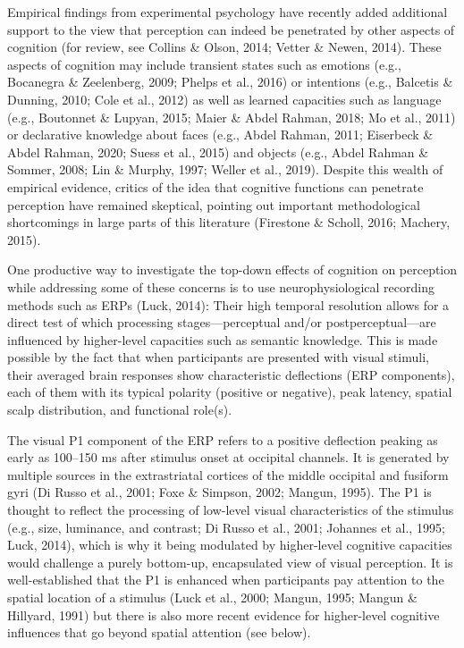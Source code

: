 \documentclass[
  english,
  doc,12pt,twoside,floatsintext]{apa7}
\begin{document}
Empirical findings from experimental psychology have recently added additional support to the view that perception can indeed be penetrated by other aspects of cognition (for review, see Collins \& Olson, 2014; Vetter \& Newen, 2014). These aspects of cognition may include transient states such as emotions (e.g., Bocanegra \& Zeelenberg, 2009; Phelps et al., 2016) or intentions (e.g., Balcetis \& Dunning, 2010; Cole et al., 2012) as well as learned capacities such as language (e.g., Boutonnet \& Lupyan, 2015; Maier \& Abdel Rahman, 2018; Mo et al., 2011) or declarative knowledge about faces (e.g., Abdel Rahman, 2011; Eiserbeck \& Abdel Rahman, 2020; Suess et al., 2015) and objects (e.g., Abdel Rahman \& Sommer, 2008; Lin \& Murphy, 1997; Weller et al., 2019). Despite this wealth of empirical evidence, critics of the idea that cognitive functions can penetrate perception have remained skeptical, pointing out important methodological shortcomings in large parts of this literature (Firestone \& Scholl, 2016; Machery, 2015).

One productive way to investigate the top-down effects of cognition on perception while addressing some of these concerns is to use neurophysiological recording methods such as ERPs (Luck, 2014): Their high temporal resolution allows for a direct test of which processing stages---perceptual and/or postperceptual---are influenced by higher-level capacities such as semantic knowledge. This is made possible by the fact that when participants are presented with visual stimuli, their averaged brain responses show characteristic deflections (ERP components), each of them with its typical polarity (positive or negative), peak latency, spatial scalp distribution, and functional role(s).

The visual P1 component of the ERP refers to a positive deflection peaking as early as 100--150 ms after stimulus onset at occipital channels. It is generated by multiple sources in the extrastriatal cortices of the middle occipital and fusiform gyri (Di Russo et al., 2001; Foxe \& Simpson, 2002; Mangun, 1995). The P1 is thought to reflect the processing of low-level visual characteristics of the stimulus (e.g., size, luminance, and contrast; Di Russo et al., 2001; Johannes et al., 1995; Luck, 2014), which is why it being modulated by higher-level cognitive capacities would challenge a purely bottom-up, encapsulated view of visual perception. It is well-established that the P1 is enhanced when participants pay attention to the spatial location of a stimulus (Luck et al., 2000; Mangun, 1995; Mangun \& Hillyard, 1991) but there is also more recent evidence for higher-level cognitive influences that go beyond spatial attention (see below).
\end{document}
